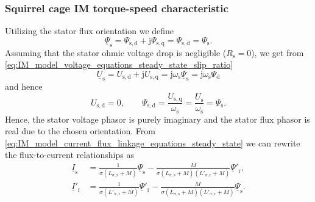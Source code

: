 \begin{frame}
	\frametitle{Squirrel cage IM torque-speed characteristic} 
    Utilizing the stator flux orientation we define
    $$ \underline{\Psi}_\mathrm{s} = \Psi_\mathrm{s,d} + \mathrm{j}\Psi_\mathrm{s,q} = \Psi_\mathrm{s,d} = \Psi_\mathrm{s}.
    $$
    Assuming that the stator ohmic voltage drop is negligible ($R_\mathrm{s}=0$), we get from \eqref{eq:IM_model_voltage_equations_steady_state_slip_ratio} 
    \begin{equation}
        \underline{U}_\mathrm{s} = U_\mathrm{s,d} + \mathrm{j} U_\mathrm{s,q} = \mathrm{j}\omega_\mathrm{s}\underline{\Psi}_\mathrm{s} = \mathrm{j}\omega_\mathrm{s}\Psi_\mathrm{d}
    \end{equation} 
    and hence
    \begin{equation}
        U_\mathrm{s,d} = 0, \qquad \Psi_\mathrm{s,d}  = \frac{U_\mathrm{s,q}}{\omega_\mathrm{s}}= \frac{U_\mathrm{s}}{\omega_\mathrm{s}}= \Psi_\mathrm{s}.
        \label{eq:IM_model_stator_flux_orientation_steady_state}
    \end{equation}
    Hence, the stator voltage phasor is purely imaginary and the stator flux phasor is real due to the chosen orientation.  From \eqref{eq:IM_model_current_flux_linkage_equations_steady_state} we can rewrite the flux-to-current relationships as
    \begin{equation}
        \begin{split}
            \underline{I}_\mathrm{s} &= \frac{1}{\sigma (L_{\sigma,\mathrm{s}} +M)} \underline{\Psi}_\mathrm{s} -  \frac{M}{\sigma(L_{\sigma,\mathrm{s}} +M)(L'_{\sigma,\mathrm{r}} +M)}\underline{\Psi}'_\mathrm{r},\\
            \underline{I}'_\mathrm{r} &= \frac{1}{\sigma (L'_{\sigma,\mathrm{r}} +M)} \underline{\Psi}'_\mathrm{r} -  \frac{M}{\sigma(L_{\sigma,\mathrm{s}} +M)(L'_{\sigma,\mathrm{r}} +M)}\underline{\Psi}_\mathrm{s}.
        \end{split}
        \label{eq:IM_model_current_flux_linkage_equations_steady_state_squirrel_cage}
    \end{equation}
\end{frame}

